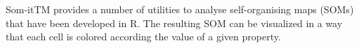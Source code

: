 Som-itTM  provides a number of utilities to analyse self-organising maps (SOMs) that have been developed in R. The resulting SOM can be visualized in a way that each cell is colored according the value of a given property.